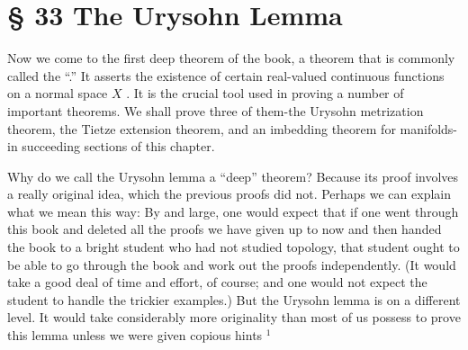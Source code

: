 \section*{§ 33 The Urysohn Lemma}

Now we come to the first deep theorem of the book, a theorem that is commonly called the ``.'' It asserts the existence of certain real-valued continuous functions on a normal space \(X\) . It is the crucial tool used in proving a number of important theorems. We shall prove three of them-the Urysohn metrization theorem, the Tietze extension theorem, and an imbedding theorem for manifolds-in succeeding sections of this chapter.

Why do we call the Urysohn lemma a ``deep'' theorem? Because its proof involves a really original idea, which the previous proofs did not. Perhaps we can explain what we mean this way: By and large, one would expect that if one went through this book and deleted all the proofs we have given up to now and then handed the book to a bright student who had not studied topology, that student ought to be able to go through the book and work out the proofs independently. (It would take a good deal of time and effort, of course; and one would not expect the student to handle the trickier examples.) But the Urysohn lemma is on a different level. It would take considerably more originality than most of us possess to prove this lemma unless we were given copious hints \({}^{1}\)

